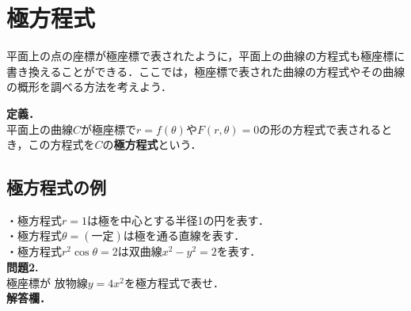 \documentclass[a4paper]{ltjsarticle}
\theoremstyle{definition}
\newcommand{\1}{$\star$}
\newcommand{\2}{$\star\star$}
\newcommand{\3}{$\star\star\star$}
\newcommand{\4}{$\star\star\star\star$}
\begin{document}
\newpage
\section{極方程式}
\thispagestyle{empty}
平面上の点の座標が極座標で表されたように，平面上の曲線の方程式も極座標に書き換えることができる．ここでは，極座標で表された曲線の方程式やその曲線の概形を調べる方法を考えよう．
\begin{tcolorbox}[top=2mm, left=5mm, bottom=2mm,
    sharp corners]
   \textbf{定義．}　\\[3pt]
          平面上の曲線$C$が極座標で$r=f(\theta)$や$F(r,\theta)=0$の形の方程式で表されるとき，この方程式を$C$の\textbf{極方程式}という．
  \end{tcolorbox}
  \subsection{極方程式の例}
\noindent   ・極方程式$r=1$は極を中心とする半径1の円を表す．\\
  ・極方程式$\theta=(一定)$は極を通る直線を表す．\\
  ・極方程式$r^2\cos\theta=2$は双曲線$x^2-y^2=2$を表す．\\[3pt]
  \noindent \textbf{問題2.}\\[3pt]
  \noindent 極座標が
  放物線$y=4x^2$を極方程式で表せ．\\[3pt]
  \textbf{解答欄．}\\[70pt]
\end{document}
